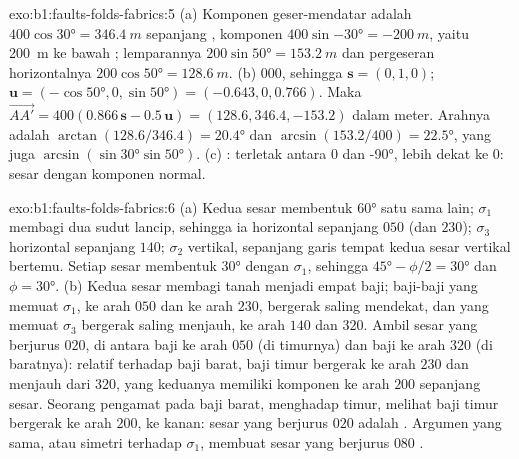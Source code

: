 \begin{solution}{exo:b1:faults-folds-fabrics:5}
(a) Komponen geser-mendatar adalah $400\cos\ang{30} = \qty{346.4}{m}$ sepanjang , komponen  $400\sin\ang{-30} = \qty{-200}{m}$, yaitu \qty{200}{m} ke bawah ; lemparannya $200\sin\ang{50} = \qty{153.2}{m}$ dan pergeseran horizontalnya $200\cos\ang{50} = \qty{128.6}{m}$. (b)  $000$, sehingga $\mathbf s = (0, 1, 0)$;
$\mathbf u = (-\cos\ang{50}, 0, \sin\ang{50}) =
(-0.643, 0, 0.766)$. Maka
$\overrightarrow{AA'} = 400(0.866\,\mathbf s - 0.5\,\mathbf u) =
(128.6, 346.4, -153.2)$ dalam meter. Arahnya adalah $\arctan(128.6/346.4) =
\ang{20.4}$ dan  $\arcsin(153.2/400) = \ang{22.5}$, yang juga
$\arcsin(\sin\ang{30}\sin\ang{50})$. (c) :  terletak
antara $0$ dan \ang{-90}, lebih dekat ke $0$: sesar  dengan komponen normal.
\end{solution}

\begin{solution}{exo:b1:faults-folds-fabrics:6}
(a) Kedua sesar membentuk \ang{60} satu sama lain; $\sigma_1$ membagi dua sudut lancip, sehingga ia horizontal sepanjang $050$ (dan $230$); $\sigma_3$ horizontal sepanjang $140$;
$\sigma_2$ vertikal, sepanjang garis tempat kedua sesar vertikal bertemu. Setiap sesar membentuk \ang{30} dengan $\sigma_1$, sehingga $\ang{45} - \phi/2 =
\ang{30}$ dan $\phi = \ang{30}$. (b) Kedua sesar membagi tanah menjadi empat baji; baji-baji yang memuat $\sigma_1$, ke arah $050$ dan ke arah $230$, bergerak saling mendekat, dan yang memuat $\sigma_3$ bergerak saling menjauh, ke arah $140$ dan $320$. Ambil sesar yang berjurus $020$, di antara baji ke arah $050$ (di timurnya) dan baji ke arah $320$ (di baratnya): relatif terhadap baji barat, baji timur bergerak ke arah $230$ dan menjauh dari $320$, yang keduanya memiliki komponen ke arah $200$ sepanjang sesar. Seorang pengamat pada baji barat, menghadap timur, melihat baji timur bergerak ke arah $200$, ke kanan: sesar yang berjurus $020$ adalah . Argumen yang sama, atau simetri terhadap $\sigma_1$, membuat sesar yang berjurus $080$ .
\end{solution}

